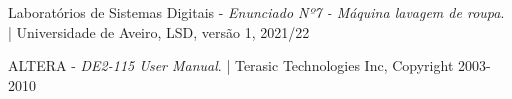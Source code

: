 %
%
\begin{thebibliography}{9}

Laboratórios de Sistemas Digitais -
\textit{Enunciado Nº7 - Máquina lavagem de roupa}. |
Universidade de Aveiro, LSD, versão 1, 2021/22


ALTERA -
\textit{DE2-115 User Manual}. |
Terasic Technologies Inc, Copyright 2003-2010


\end{thebibliography}

